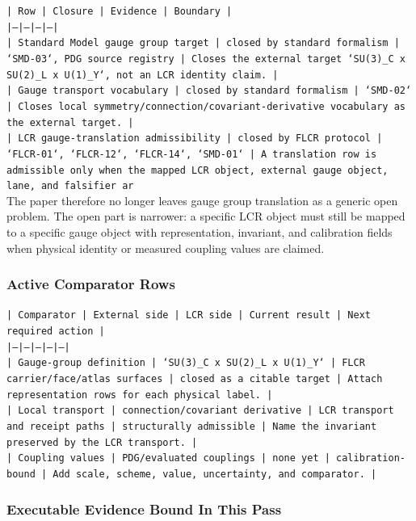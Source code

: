 \documentclass[11pt]{article}
\begin{document}
\noindent\texttt{| Row | Closure | Evidence | Boundary |}\\
\noindent\texttt{|---|---|---|---|}\\
\noindent\texttt{| Standard Model gauge group target | closed by standard formalism | `SMD-03`, PDG source registry | Closes the external target `SU(3)\_C x SU(2)\_L x U(1)\_Y`, not an LCR identity claim. |}\\
\noindent\texttt{| Gauge transport vocabulary | closed by standard formalism | `SMD-02` | Closes local symmetry/connection/covariant-derivative vocabulary as the external target. |}\\
\noindent\texttt{| LCR gauge-translation admissibility | closed by FLCR protocol | `FLCR-01`, `FLCR-12`, `FLCR-14`, `SMD-01` | A translation row is admissible only when the mapped LCR object, external gauge object, lane, and falsifier ar}\\

The paper therefore no longer leaves gauge group translation as a generic open problem. The open part is narrower: a specific LCR object must still be mapped to a specific gauge object with representation, invariant, and calibration fields when physical identity or measured coupling values are claimed.

\subsubsection*{Active Comparator Rows}

\noindent\texttt{| Comparator | External side | LCR side | Current result | Next required action |}\\
\noindent\texttt{|---|---|---|---|---|}\\
\noindent\texttt{| Gauge-group definition | `SU(3)\_C x SU(2)\_L x U(1)\_Y` | FLCR carrier/face/atlas surfaces | closed as a citable target | Attach representation rows for each physical label. |}\\
\noindent\texttt{| Local transport | connection/covariant derivative | LCR transport and receipt paths | structurally admissible | Name the invariant preserved by the LCR transport. |}\\
\noindent\texttt{| Coupling values | PDG/evaluated couplings | none yet | calibration-bound | Add scale, scheme, value, uncertainty, and comparator. |}\\

\subsubsection*{Executable Evidence Bound In This Pass}
\end{document}
